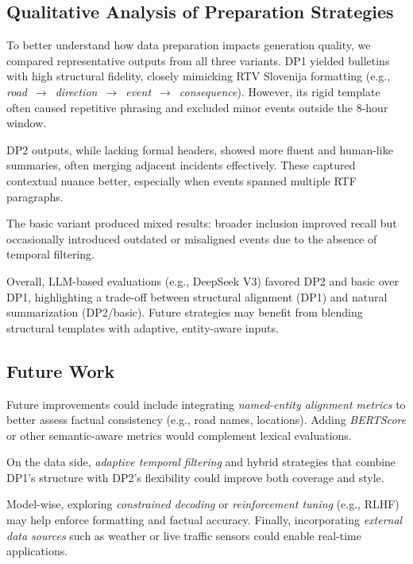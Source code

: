 \documentclass[fleqn,moreauthors,10pt]{ds_report}
\begin{document}
\subsection*{Qualitative Analysis of Preparation Strategies}
To better understand how data preparation impacts generation quality, we compared representative outputs from all three variants. DP1 yielded bulletins with high structural fidelity, closely mimicking RTV Slovenija formatting (e.g., \textit{road}~$\rightarrow$~\textit{direction}~$\rightarrow$~\textit{event}~$\rightarrow$~\textit{consequence}). However, its rigid template often caused repetitive phrasing and excluded minor events outside the 8-hour window.

DP2 outputs, while lacking formal headers, showed more fluent and human-like summaries, often merging adjacent incidents effectively. These captured contextual nuance better, especially when events spanned multiple RTF paragraphs.

The basic variant produced mixed results: broader inclusion improved recall but occasionally introduced outdated or misaligned events due to the absence of temporal filtering.

Overall, LLM-based evaluations (e.g., DeepSeek V3) favored DP2 and basic over DP1, highlighting a trade-off between structural alignment (DP1) and natural summarization (DP2/basic). Future strategies may benefit from blending structural templates with adaptive, entity-aware inputs.

% 

\subsection*{Future Work}

Future improvements could include integrating \emph{named-entity alignment metrics} to better assess factual consistency (e.g., road names, locations). Adding \emph{BERTScore} or other semantic-aware metrics would complement lexical evaluations.

On the data side, \emph{adaptive temporal filtering} and hybrid strategies that combine DP1's structure with DP2's flexibility could improve both coverage and style.

Model-wise, exploring \emph{constrained decoding} or \emph{reinforcement tuning} (e.g., RLHF) may help enforce formatting and factual accuracy. Finally, incorporating \emph{external data sources} such as weather or live traffic sensors could enable real-time applications.
\end{document}
